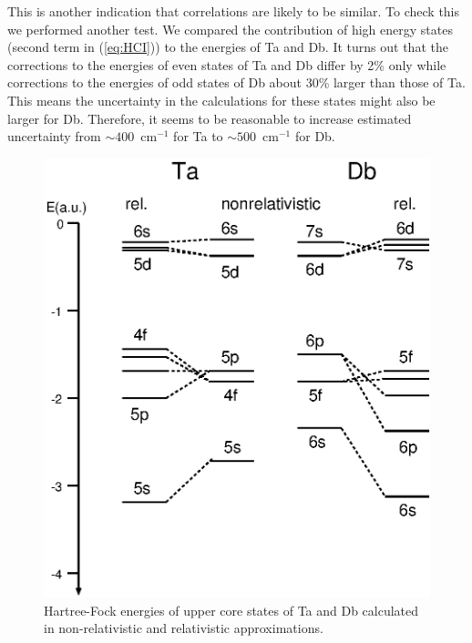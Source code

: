 \documentclass[10pt,a4paper, twoside, openright]{report}
\begin{document}
This is another indication that correlations are likely to be similar.  To check this we performed another test. We
compared the contribution of high energy states (second term in (\ref{eq:HCI})) to the energies of Ta and Db.
It turns out that the corrections to the energies of even states of Ta and Db differ by 2\% only while corrections to 
the energies of odd states of Db about 30\% larger than those of Ta. This means the uncertainty in the calculations for these
states might also be larger for Db. Therefore, it seems to be reasonable to increase estimated uncertainty from 
$ \sim 400$~cm$^{-1}$ for Ta to $ \sim 500$~cm$^{-1}$ for Db.
\begin{figure}[tb]
\includegraphics[scale=0.7]{./figures/el.eps}
\caption{Hartree-Fock energies of upper core states of Ta and Db calculated in non-relativistic and relativistic 
approximations.}
\label{f:el}
\end{figure}
\end{document}
